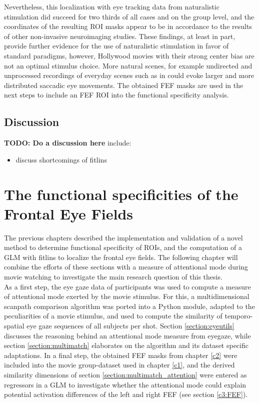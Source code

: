 \documentclass[a4paper, 12pt]{scrreprt}
\begin{document}
Nevertheless, this localization with eye tracking data from naturalistic stimulation did succeed for two thirds of all cases and on the group level, and the coordinates of the resulting ROI masks appear to be in accordance to the results of other non-invasive neuroimaging studies. These findings, at least in part, provide further evidence for the use of naturalistic stimulation in favor of standard paradigms, however, Hollywood movies with their strong center bias are not an optimal stimulus choice. More natural scenes, for example undirected and unprocessed recordings of everyday scenes such as in \textcite{tseng2009quantifying} could evoke larger and more distributed saccadic eye movements. The obtained FEF masks are used in the next steps to include an FEF ROI into the functional specificity analysis.



\section{Discussion}
\textbf{TODO: Do a discussion here}
include:
\begin{itemize}

	\item{discuss shortcomings of fitlins}
	
\end{itemize}


\chapter{The functional specificities of the Frontal Eye Fields}\label{c3}

The previous chapters described the implementation and validation of a novel method to determine functional specificity of ROIs, and the computation of a GLM with fitlins to localize the frontal eye fields. The following chapter will combine the efforts of these sections with a measure of attentional mode during movie watching to investigate the main research question of this thesis.\\
As a first step, the eye gaze data of participants was used to compute a measure of attentional mode exerted by the movie stimulus. For this, a multidimensional scanpath comparison algorithm was ported into a Python module, adapted to the peculiarities of a movie stimulus, and used to compute the similarity of temporo-spatial eye gaze sequences of all subjects per shot. Section \ref{section:eyeutils} discusses the reasoning behind an attentional mode measure from eyegaze, while section \ref{section:multimatch} elaborates on the algorithm and its dataset specific adaptations.
In a final step, the obtained FEF masks from chapter \ref{c2} were included into the movie group-dataset used in chapter \ref{c1}, and the derived similarity dimensions of section \ref{section:multimatch_attention} were entered as regressors in a GLM to investigate whether the attentional mode could explain potential activation differences of the left and right FEF (see section \ref{c3:FEF}). 
\end{document}
